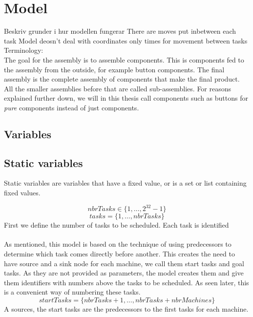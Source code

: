 \documentclass[10pt,a4paper]{report}
\begin{document}
\section*{Model}
Beskriv grunder i hur modellen fungerar
There are moves put inbetween each task
Model deosn't deal with coordinates only times for movement between tasks
\\Terminology:\\
The goal for the assembly is to assemble components. This is components fed to the assembly from the outside, for example button components. The final assembly is the complete assembly of components that make the final product. All the smaller assemblies before that are called sub-assemblies. For reasons explained further down, we will in this thesis call components such as buttons for \emph{pure} components instead of just components.
\subsection*{Variables}
\subsection*{Static variables}
Static variables are variables that have a fixed value, or is a set or list containing fixed values.

\begin{equation}\label{eq:1}
nbrTasks \in \{1 , \ldots , 2^{32}-1\}
\end{equation}
\begin{equation}\label{eq:10}
tasks = \{1 , \ldots , nbrTasks\}\end{equation}
First we define the number of tasks to be scheduled. Each task is identified 
\\\\
As mentioned, this model is based on the technique of using predecessors to determine which task comes directly before another. This creates the need to have source and a sink node for each machine, we call them start tasks and goal tasks. As they are not provided as parameters, the model creates them and give them identifiers with numbers above the tasks to be scheduled. As seen later, this is a convenient way of numbering these tasks.
\begin{equation}\label{eq:19}
startTasks = \{nbrTasks+1 , \ldots , nbrTasks+nbrMachines\}\end{equation}
A sources, the start tasks are the predecessors to the first tasks for each machine.
\end{document}
